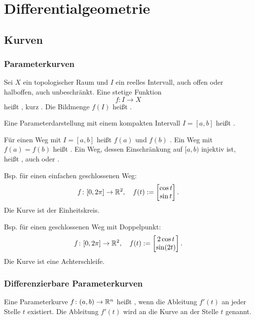 
\chapter{Differentialgeometrie}
\section{Kurven}
\subsection{Parameterkurven}
\begin{Definition}
Sei $X$ ein topologischer Raum und
$I$ ein reelles Intervall, auch offen oder halboffen, auch unbeschränkt.
Eine stetige Funktion
\begin{equation}
f\colon I\to X
\end{equation}
heißt , kurz
. Die Bildmenge $f(I)$ heißt .
\end{Definition}

Eine Parameterdarstellung mit einem kompakten Intervall $I=[a,b]$
heißt .

Für einen Weg mit $I=[a,b]$ heißt $f(a)$ 
und $f(b)$ . Ein Weg mit $f(a)=f(b)$
heißt . Ein Weg, dessen Einschränkung auf $[a,b)$
injektiv ist, heißt , auch  oder
.

Bsp. für einen einfachen geschlossenen Weg:
\begin{equation}
f\colon [0,2\pi]\to \mathbb R^2,\quad
f(t):=\begin{bmatrix}
\cos t\\
\sin t
\end{bmatrix}.
\end{equation}
Die Kurve ist der Einheitskreis.

Bsp. für einen geschlossenen Weg mit Doppelpunkt:
\begin{equation}
f\colon [0,2\pi]\to \mathbb R^2,\quad
f(t):=\begin{bmatrix}
2\cos t\\
\sin(2t)
\end{bmatrix}.
\end{equation}
Die Kurve ist eine Achterschleife.

\subsection{Differenzierbare Parameterkurven}
\begin{Definition}
Eine Parameterkurve $f\colon (a,b)\to\mathbb R^n$ heißt
, wenn die Ableitung $f'(t)$ an jeder Stelle
$t$ existiert. Die Ableitung $f'(t)$ wird
 an die Kurve an der Stelle $t$ genannt.
\end{Definition}

